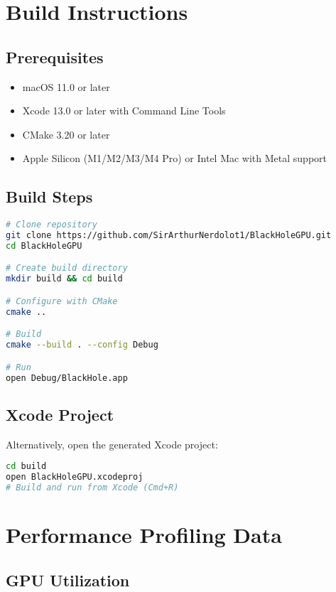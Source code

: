 \documentclass[12pt,a4paper]{article}
\theoremstyle{definition}
\theoremstyle{remark}
\begin{document}
\section{Build Instructions}

\subsection{Prerequisites}

\begin{itemize}
    \item macOS 11.0 or later
    \item Xcode 13.0 or later with Command Line Tools
    \item CMake 3.20 or later
    \item Apple Silicon (M1/M2/M3/M4 Pro) or Intel Mac with Metal support
\end{itemize}

\subsection{Build Steps}

\begin{lstlisting}[language=bash, caption=CMake build process]
# Clone repository
git clone https://github.com/SirArthurNerdolot1/BlackHoleGPU.git
cd BlackHoleGPU

# Create build directory
mkdir build && cd build

# Configure with CMake
cmake ..

# Build
cmake --build . --config Debug

# Run
open Debug/BlackHole.app
\end{lstlisting}

\subsection{Xcode Project}

Alternatively, open the generated Xcode project:

\begin{lstlisting}[language=bash]
cd build
open BlackHoleGPU.xcodeproj
# Build and run from Xcode (Cmd+R)
\end{lstlisting}

\section{Performance Profiling Data}

\subsection{GPU Utilization}
\end{document}
